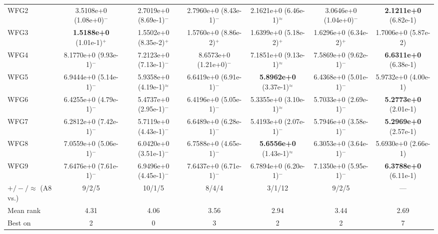 \begin{table}[!t]
\begin{tabular}{lcccccc}
WFG2 & 3.5108e+0 (1.08e+0)$^{-}$ & 2.7019e+0 (8.69e-1)$^{-}$ & 2.7960e+0 (8.43e-1)$^{-}$ & 2.1621e+0 (6.46e-1)$^{\approx}$ & 3.0646e+0 (1.04e+0)$^{-}$ & \textbf{2.1211e+0} (6.82e-1) \\
WFG3 & \textbf{1.5188e+0} (1.01e-1)$^{+}$ & 1.5502e+0 (8.35e-2)$^{+}$ & 1.5760e+0 (8.86e-2)$^{+}$ & 1.6399e+0 (5.18e-2)$^{+}$ & 1.6296e+0 (6.34e-2)$^{+}$ & 1.7006e+0 (5.87e-2) \\
WFG4 & 8.1770e+0 (9.93e-1)$^{-}$ & 7.2123e+0 (7.13e-1)$^{-}$ & 8.6573e+0 (1.21e+0)$^{-}$ & 7.1851e+0 (9.13e-1)$^{\approx}$ & 7.5869e+0 (9.62e-1)$^{-}$ & \textbf{6.6311e+0} (6.38e-1) \\
WFG5 & 6.9444e+0 (5.14e-1)$^{-}$ & 5.9358e+0 (4.19e-1)$^{\approx}$ & 6.6419e+0 (6.91e-1)$^{-}$ & \textbf{5.8962e+0} (3.37e-1)$^{\approx}$ & 6.4368e+0 (5.01e-1)$^{-}$ & 5.9732e+0 (4.00e-1) \\
WFG6 & 6.4255e+0 (4.79e-1)$^{-}$ & 5.4737e+0 (2.95e-1)$^{-}$ & 6.4196e+0 (5.05e-1)$^{-}$ & 5.3355e+0 (3.10e-1)$^{\approx}$ & 5.7033e+0 (2.69e-1)$^{-}$ & \textbf{5.2773e+0} (2.01e-1) \\
WFG7 & 6.2812e+0 (7.42e-1)$^{-}$ & 5.7119e+0 (4.43e-1)$^{-}$ & 6.6489e+0 (6.28e-1)$^{-}$ & 5.4193e+0 (2.07e-1)$^{-}$ & 5.7946e+0 (3.58e-1)$^{-}$ & \textbf{5.2969e+0} (2.57e-1) \\
WFG8 & 7.0559e+0 (5.06e-1)$^{-}$ & 6.0420e+0 (3.51e-1)$^{-}$ & 6.7588e+0 (4.65e-1)$^{-}$ & \textbf{5.6556e+0} (1.43e-1)$^{\approx}$ & 6.3053e+0 (3.64e-1)$^{-}$ & 5.6930e+0 (2.66e-1) \\
WFG9 & 7.6476e+0 (7.61e-1)$^{-}$ & 6.9496e+0 (4.45e-1)$^{-}$ & 7.6437e+0 (6.71e-1)$^{-}$ & 6.7894e+0 (6.20e-1)$^{-}$ & 7.1350e+0 (5.95e-1)$^{-}$ & \textbf{6.3788e+0} (6.11e-1) \\
\midrule
$+/-/\approx$ (A8 vs.) & 9/2/5 & 10/1/5 & 8/4/4 & 3/1/12 & 9/2/5 & --- \\
Mean rank & 4.31 & 4.06 & 3.56 & 2.94 & 3.44 & 2.69 \\
Best on & 2 & 0 & 3 & 2 & 2 & 7 \\
\bottomrule
\end{tabular}
\end{table}

